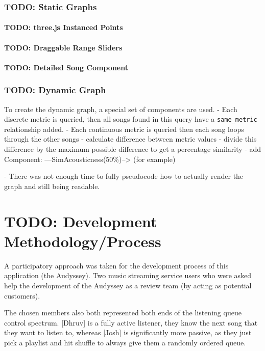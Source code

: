 \subsubsection{TODO: Static Graphs}
\paragraph{TODO: three.js Instanced Points}
\paragraph{TODO: Draggable Range Sliders}
\paragraph{TODO: Detailed Song Component}

\subsubsection{TODO: Dynamic Graph}
To create the dynamic graph, a special set of components are used.
- Each discrete metric is queried, then all songs found in this query have a \texttt{same\_metric} relationship added.
- Each continuous metric is queried then each song loops through the other songs
    - calculate difference between metric values
    - divide this difference by the maximum possible difference to get a percentage similarity
    - add Component: ---SimAcousticness(50\%)--> (for example)

- There was not enough time to fully pseudocode how to actually render the graph and still being readable.

\section{TODO: Development Methodology/Process}
A participatory approach was taken for the development process of this application (the Audyssey). Two music streaming service users who were asked help the development of the Audyssey as a review team (by acting as potential customers).

The chosen members also both represented both ends of the listening queue control spectrum. [Dhruv] is a fully active listener, they know the next song that they want to listen to, whereas [Josh] is significantly more passive, as they just pick a playlist and hit shuffle to always give them a randomly ordered queue.

